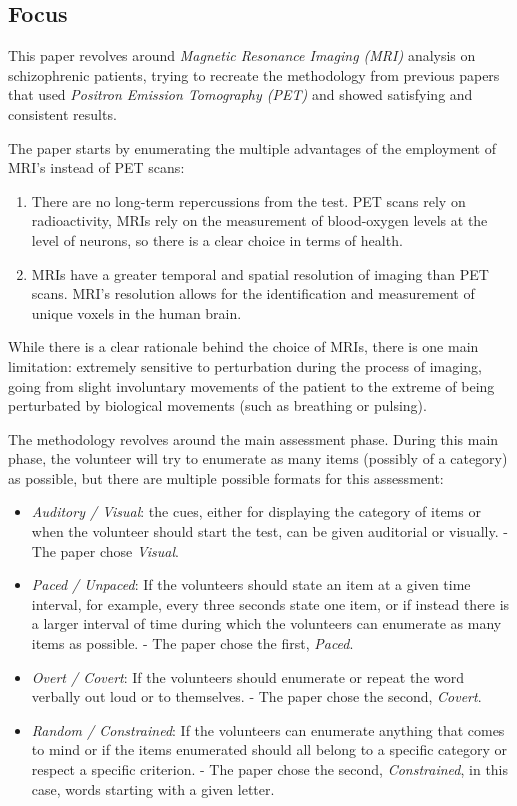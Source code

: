 \documentclass{Paper_Summary}
\begin{document}
\makepapertitle

\breakline

\begin{center}
    \section*{Focus}
\end{center}
    
    This paper revolves around \emph{Magnetic Resonance Imaging (MRI)} analysis on schizophrenic patients, trying to recreate the methodology from previous papers that used \emph{Positron Emission Tomography (PET)} and showed satisfying and consistent results.

    The paper starts by enumerating the multiple advantages of the employment of MRI's instead of PET scans:
    \begin{enumerate}
        \item There are no long-term repercussions from the test. PET scans rely on radioactivity, MRIs rely on the measurement of blood-oxygen levels at the level of neurons, so there is a clear choice in terms of health.
        \item MRIs have a greater temporal and spatial resolution of imaging than PET scans. MRI's resolution allows for the identification and measurement of unique voxels in the human brain.
    \end{enumerate}
    While there is a clear rationale behind the choice of MRIs, there is one main limitation: extremely sensitive to perturbation during the process of imaging, going from slight involuntary movements of the patient to the extreme of being perturbated by biological movements (such as breathing or pulsing).

    The methodology revolves around the main assessment phase. During this main phase, the volunteer will try to enumerate as many items (possibly of a category) as possible, but there are multiple possible formats for this assessment:
    \begin{itemize}
        \item \emph{Auditory / Visual}: the cues, either for displaying the category of items or when the volunteer should start the test, can be given auditorial or visually. - The paper chose \emph{Visual}.
        \item \emph{Paced / Unpaced}: If the volunteers should state an item at a given time interval, for example, every three seconds state one item, or if instead there is a larger interval of time during which the volunteers can enumerate as many items as possible. - The paper chose the first, \emph{Paced}.
        \item \emph{Overt / Covert}: If the volunteers should enumerate or repeat the word verbally out loud or to themselves. - The paper chose the second, \emph{Covert}.
        \item \emph{Random / Constrained}: If the volunteers can enumerate anything that comes to mind or if the items enumerated should all belong to a specific category or respect a specific criterion. - The paper chose the second, \emph{Constrained}, in this case, words starting with a given letter.
    \end{itemize}
\end{document}
